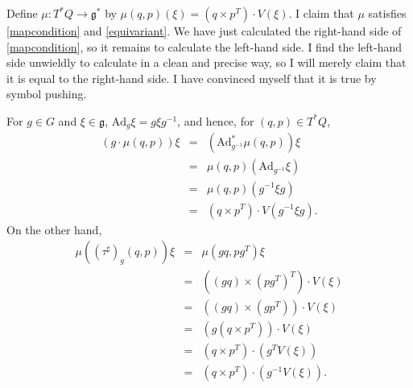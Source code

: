 \documentclass{article}
\newcommand{\Ad}{\textrm{Ad}}
\begin{document}
Define $\mu:T^*Q \to \mathfrak{g^*}$ by $\mu(q,p)(\xi)=(q \times p^T) \cdot V(\xi)$. I claim that $\mu$ satisfies \eqref{mapcondition} and \eqref{equivariant}.  We have just calculated the right-hand side
of \eqref{mapcondition}, so it remains to calculate the left-hand side. I find the left-hand side unwieldly to calculate in a clean and precise
way, so I will merely claim that it is equal to the right-hand side. I have convinced myself that it is true by symbol pushing.

For $g \in G$ and $\xi \in \mathfrak{g}$, $\Ad_g \xi=g\xi g^{-1}$, and hence, for $(q,p) \in T^*Q$,
\begin{eqnarray*}
(g\cdot \mu(q,p))\xi&=&\left(\Ad_{g^{-1}}^* \mu(q,p) \right)\xi\\
&=&\mu(q,p)(\Ad_{g^{-1}} \xi)\\
&=&\mu(q,p)(g^{-1}\xi g)\\
&=&(q \times p^T)\cdot V(g^{-1} \xi g).
\end{eqnarray*}
On the other hand,
\begin{eqnarray*}
\mu((\tau^\sharp)_g(q,p))\xi&=&\mu(gq,pg^T)\xi\\
&=&((gq) \times (pg^T)^T) \cdot V(\xi)\\
&=&((gq) \times (gp^T)) \cdot V(\xi)\\
&=&(g(q \times p^T)) \cdot V(\xi)\\
&=&(q \times p^T) \cdot (g^T V(\xi))\\
&=&(q \times p^T) \cdot (g^{-1} V(\xi)).
\end{eqnarray*}
\end{document}
